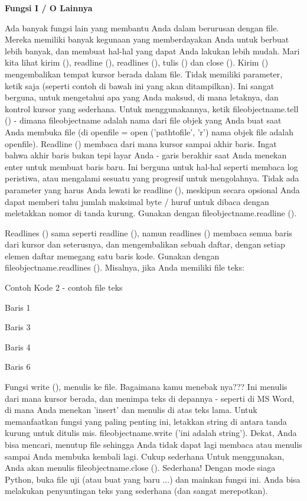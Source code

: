 \noindent 
{\fontsize{14pt}{14pt}\selectfont \textbf{Fungsi I / O Lainnya} \\} \par
\vspace{12pt}
Ada banyak fungsi lain yang membantu Anda dalam berurusan dengan file. Mereka memiliki banyak kegunaan yang memberdayakan Anda untuk berbuat lebih banyak, dan membuat hal-hal yang dapat Anda lakukan lebih mudah. Mari kita lihat kirim (), readline (), readlines (), tulis () dan close (). Kirim () mengembalikan tempat kursor berada dalam file. Tidak memiliki parameter, ketik saja (seperti contoh di bawah ini yang akan ditampilkan). Ini sangat berguna, untuk mengetahui apa yang Anda maksud, di mana letaknya, dan kontrol kursor yang sederhana. Untuk menggunakannya, ketik fileobjectname.tell () - dimana fileobjectname adalah nama dari file objek yang Anda buat saat Anda membuka file (di openfile = open ('pathtofile', 'r') nama objek file adalah openfile). Readline () membaca dari mana kursor sampai akhir baris. Ingat bahwa akhir baris bukan tepi layar Anda - garis berakhir saat Anda menekan enter untuk membuat baris baru. Ini berguna untuk hal-hal seperti membaca log peristiwa, atau mengalami sesuatu yang progresif untuk mengolahnya. Tidak ada parameter yang harus Anda lewati ke readline (), meskipun secara opsional Anda dapat memberi tahu jumlah maksimal byte / huruf untuk dibaca dengan meletakkan nomor di tanda kurung. Gunakan dengan fileobjectname.readline (). \par
Readlines () sama seperti readline (), namun readlines () membaca semua baris dari kursor dan seterusnya, dan mengembalikan sebuah daftar, dengan setiap elemen daftar memegang satu baris kode. Gunakan dengan fileobjectname.readlines (). Misalnya, jika Anda memiliki file teks: \par
\noindent 
Contoh Kode 2 - contoh file teks \par
\vspace{12pt}
\noindent 
Baris 1 \par
\vspace{12pt}
\noindent 
Baris 3 \par
\noindent 
Baris 4 \par
\vspace{12pt}
\noindent 
Baris 6 \par
\vspace{12pt}
Fungsi write (), menulis ke file. Bagaimana kamu menebak nya??? Ini menulis dari mana kursor berada, dan menimpa teks di depannya - seperti di MS Word, di mana Anda menekan 'insert' dan menulis di atas teks lama. Untuk memanfaatkan fungsi yang paling penting ini, letakkan string di antara tanda kurung untuk ditulis mis. fileobjectname.write ('ini adalah string'). \hspace*{0.5in} Dekat, Anda bisa mencari, menutup file sehingga Anda tidak dapat lagi membaca atau menulis sampai Anda membuka kembali lagi. Cukup sederhana Untuk menggunakan, Anda akan menulis fileobjectname.close (). Sederhana! Dengan mode siaga Python, buka file uji (atau buat yang baru ...) dan mainkan fungsi ini. Anda bisa melakukan penyuntingan teks yang sederhana (dan sangat merepotkan). \par
